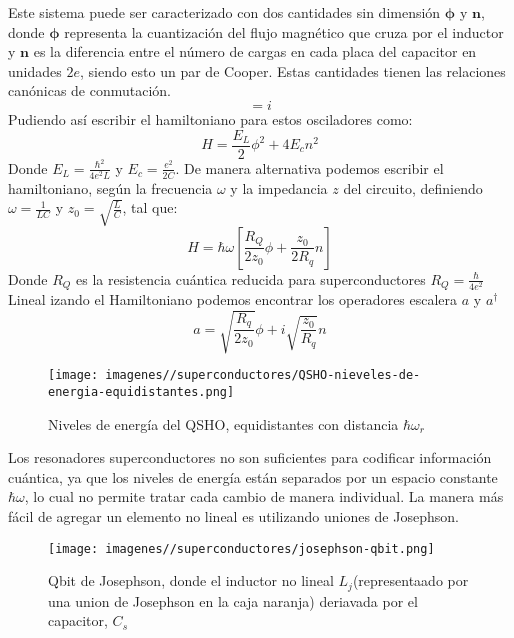 Este sistema puede ser caracterizado con dos cantidades sin dimensión $\mathbf{\phi}$ y $\mathbf{n}$, donde $\mathbf{\phi}$ representa la cuantización del flujo magnético que cruza por el inductor y $\mathbf{n}$ es la diferencia entre el número de cargas en cada placa del capacitor en unidades $2e$, siendo esto un par de Cooper. Estas cantidades tienen las relaciones canónicas de conmutación.
\begin{equation}
    [\mathbf{\phi},\mathbf{n}]=i
\end{equation}
Pudiendo así escribir el hamiltoniano para estos osciladores como:
\begin{equation}
    H=\frac{E_{L}}{2}\phi^{2}+4E_{c}n^{2}
\end{equation}
Donde $E_{L}=\frac{\hbar^{2}}{4e^{2}L}$ y $E_{c}=\frac{e^{2}}{2C}$. De manera alternativa podemos escribir el hamiltoniano, según la frecuencia $\omega$ y la impedancia $z$ del circuito, definiendo
$\omega=\frac{1}{LC}$ y $z_{0}=\sqrt{\frac{L}{C}}$, tal que:
\begin{equation}
    H=\hbar\omega\left[\frac{R_{Q}}{2z_{0}}\phi+\frac{z_{0}}{2R_{q}}n\right]
\end{equation}
Donde $R_{Q}$ es la resistencia cuántica reducida para superconductores $R_{Q}=\frac{\hbar}{4e^{2}}$\\
Lineal izando el Hamiltoniano podemos encontrar los operadores escalera $a$ y $a^{\dagger}$
\begin{equation}
    a=\sqrt{\frac{R_{q}}{2z_{0}}}\phi+i\sqrt{\frac{z_{0}}{R_{q}}}n
\end{equation}

\begin{figure}
    \centering
    \texttt{[image: imagenes//superconductores/QSHO-nieveles-de-energia-equidistantes.png]}
    \caption{Niveles de energía del QSHO, equidistantes con distancia $\hbar\omega_{r}$}
    \label{fig:enter-label}
\end{figure}


Los resonadores superconductores no son suficientes para codificar información cuántica, ya que los niveles de energía están separados por un espacio constante $\hbar\omega$, lo cual no permite tratar cada cambio de manera individual. La manera más fácil de agregar un elemento no lineal es utilizando uniones de Josephson.\\

\begin{figure}
    \centering
    \texttt{[image: imagenes//superconductores/josephson-qbit.png]}
    \caption{Qbit de Josephson, donde el inductor no lineal $L_{j}$(representaado por una union de Josephson en la caja naranja) deriavada por el capacitor, $C_{s}$}
    \label{fig:enter-label}
\end{figure}

